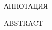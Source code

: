 




\begin{center}
	АННОТАЦИЯ
\end{center}

\begin{center}
	ABSTRACT
\end{center}


%
%
%
%
%
%



